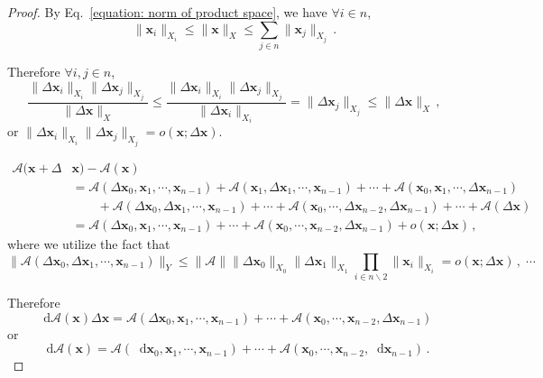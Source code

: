 \documentclass[openany]{book}
\theoremstyle{plain}
\theoremstyle{definition}
\newcommand{\dif}{\mathop{}\!\mathrm{d}} %
\newcommand*{\bv}{\boldsymbol} %
\begin{document}
\begin{proof}
	By Eq.~\eqref{equation: norm of product space}, we have $\forall i \in n$,
	\begin{equation*}
		\|\bv x_i\|_{X_i} \leq \|\bv x\|_X 
			\leq \sum_{j \in n} \|\bv x_j\|_{X_j}\,.
	\end{equation*}

	Therefore $\forall i, j \in n$,
	\begin{equation*}
		\frac{\|\Delta \bv x_i\|_{X_i} \|\Delta \bv x_j\|_{X_j}}{\|\Delta \bv x\|_X} 
		\leq \frac{\|\Delta \bv x_i\|_{X_i} \|\Delta \bv x_j\|_{X_j}}{\|\Delta \bv x_i\|_{X_i}} 
			= \|\Delta \bv x_j\|_{X_j} 
		\leq \|\Delta \bv x\|_X\,,
	\end{equation*}
	or $\|\Delta \bv x_i\|_{X_i} \|\Delta \bv x_j\|_{X_j} = o(\bv x; \Delta \bv x)$.

	\begin{align*}
		\mathscr A(\bv x + \Delta &\bv x) - \mathscr A(\bv x) 
		\\ & =
		\mathscr A(\Delta \bv x_0, \bv x_1, \cdots, \bv x_{n-1})
			+ \mathscr A(\bv x_1, \Delta \bv x_1, \cdots, \bv x_{n-1})
			+ \cdots
			+ \mathscr A(\bv x_0, \bv x_1, \cdots, \Delta \bv x_{n-1}) 
		\\ & \qquad
			+ \mathscr A(\Delta \bv x_0, \Delta \bv x_1, \cdots, \bv x_{n-1})
			+ \cdots 
			+ \mathscr A(\bv x_0, \cdots, \Delta \bv x_{n-2}, \Delta \bv x_{n-1})
			+ \cdots 
			+ \mathscr A(\Delta \bv x)
		\\ & = 
		\mathscr A(\Delta \bv x_0, \bv x_1, \cdots, \bv x_{n-1})
			+ \cdots
			+ \mathscr A(\bv x_0, \cdots, \bv x_{n - 2}, \Delta \bv x_{n-1}) 
			+ o(\bv x; \Delta \bv x)\,,
	\end{align*}
	where we utilize the fact that
	\begin{equation*}
		\|\mathscr A(\Delta \bv x_0, \Delta \bv x_1, \cdots, \bv x_{n-1})\|_Y
			\leq \|\mathscr A\| \|\Delta \bv x_0\|_{X_0} \|\Delta \bv x_1\|_{X_1}
				\prod_{i \in n \backslash 2} \|\bv x_i\|_{X_i} = o(\bv x; \Delta \bv x)\,,\; \cdots
	\end{equation*}

	Therefore
	\begin{equation*}
		\dif \mathscr A(\bv x)\Delta \bv x
			= \mathscr A(\Delta \bv x_0, \bv x_1, \cdots, \bv x_{n-1})
				+ \cdots
				+ \mathscr A(\bv x_0, \cdots, \bv x_{n - 2}, \Delta \bv x_{n-1}) 
	\end{equation*}
	or 
	\begin{equation*}
		\dif \mathscr A (\bv x) 
			= \mathscr A(\dif \bv x_0, \bv x_1, \cdots, \bv x_{n - 1}) + \cdots + \mathscr A(\bv x_0, \cdots, \bv x_{n-2}, \dif \bv x_{n-1})\,.
	\end{equation*}

\end{proof}



\backmatter
\nocite{*} %
\printbibliography[heading=bibliography, title={Bibliography}]

\printindex[symbol]

\printindex
\end{document}
